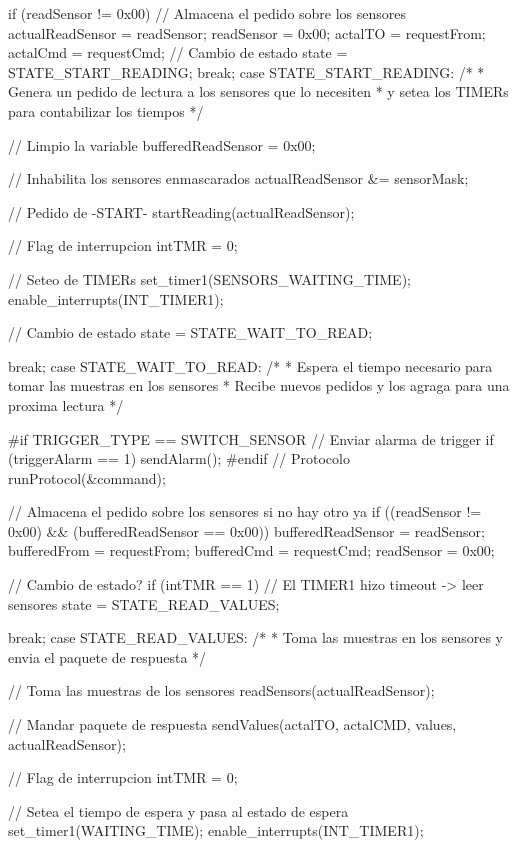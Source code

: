 {\begin{verbatimtab}
{{{				if (readSensor != 0x00)
				{
					// Almacena el pedido sobre los sensores
					actualReadSensor = readSensor;
					readSensor = 0x00;
					actalTO = requestFrom;
					actalCmd = requestCmd;
					// Cambio de estado
					state = STATE_START_READING;
				}	
				break;
			case STATE_START_READING:
				/*
				* Genera un pedido de lectura a los sensores que lo necesiten
				* y setea los TIMERs para contabilizar los tiempos
				*/
				
				// Limpio la variable
				bufferedReadSensor = 0x00;

				// Inhabilita los sensores enmascarados
				actualReadSensor &= sensorMask;
				
				// Pedido de -START-
				startReading(actualReadSensor);
				
				// Flag de interrupcion
				intTMR = 0;
				
				// Seteo de TIMERs
				set_timer1(SENSORS_WAITING_TIME);
				enable_interrupts(INT_TIMER1);
				
				// Cambio de estado
				state = STATE_WAIT_TO_READ;
				
				break;
			case STATE_WAIT_TO_READ:
				/*
				* Espera el tiempo necesario para tomar las muestras en los sensores
				* Recibe nuevos pedidos y los agraga para una proxima lectura
				*/

#if TRIGGER_TYPE == SWITCH_SENSOR
				// Enviar alarma de trigger
				if (triggerAlarm == 1)
					sendAlarm();
#endif
				// Protocolo
				runProtocol(&command);
				
				// Almacena el pedido sobre los sensores si no hay otro ya
				if ((readSensor != 0x00) && (bufferedReadSensor == 0x00))
				{
					bufferedReadSensor = readSensor;
					bufferedFrom = requestFrom;
					bufferedCmd = requestCmd;
					readSensor = 0x00;
				}
				
				// Cambio de estado?
				if (intTMR == 1)
				{
					// El TIMER1 hizo timeout -> leer sensores
					state = STATE_READ_VALUES;
				}	
				
				break;
			case STATE_READ_VALUES:
				/*
				* Toma las muestras en los sensores y envia el paquete de respuesta
				*/
				
				// Toma las muestras de los sensores
				readSensors(actualReadSensor);
				
				// Mandar paquete de respuesta
				sendValues(actalTO, actalCMD, values, actualReadSensor);
				
				// Flag de interrupcion
				intTMR = 0;
				
				// Setea el tiempo de espera y pasa al estado de espera
				set_timer1(WAITING_TIME);
				enable_interrupts(INT_TIMER1);
				
}}}
\end{verbatimtab}}
